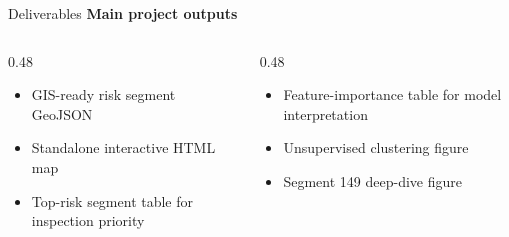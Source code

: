 \documentclass[aspectratio=169,11pt]{beamer}
\newcommand{\slideheading}[1]{\vspace{0.05cm}\textbf{#1}\vspace{0.12cm}}
\begin{document}
\begin{frame}{Deliverables}
\slideheading{Main project outputs}
\footnotesize
\begin{columns}[T,onlytextwidth]
\begin{column}{0.48\textwidth}
\begin{itemize}\setlength\itemsep{0.35em}
  \item GIS-ready risk segment GeoJSON
  \item Standalone interactive HTML map
  \item Top-risk segment table for inspection priority
\end{itemize}
\end{column}
\begin{column}{0.48\textwidth}
\begin{itemize}\setlength\itemsep{0.35em}
  \item Feature-importance table for model interpretation
  \item Unsupervised clustering figure
  \item Segment 149 deep-dive figure
\end{itemize}
\end{column}
\end{columns}
\vspace{0.45cm}
\begin{center}
\end{center}
\end{frame}
\end{document}
